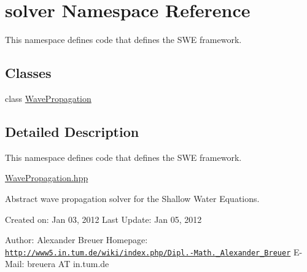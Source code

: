 \hypertarget{namespacesolver}{}\section{solver Namespace Reference}
\label{namespacesolver}


This namespace defines code that defines the S\+WE framework.  


\subsection*{Classes}
\begin{DoxyCompactItemize}
\item 
class \hyperlink{classsolver_1_1WavePropagation}{Wave\+Propagation}
\end{DoxyCompactItemize}


\subsection{Detailed Description}
This namespace defines code that defines the S\+WE framework. 

\hyperlink{WavePropagation_8hpp}{Wave\+Propagation.\+hpp}

Abstract wave propagation solver for the Shallow Water Equations.

Created on\+: Jan 03, 2012 Last Update\+: Jan 05, 2012

Author\+: Alexander Breuer Homepage\+: \href{http://www5.in.tum.de/wiki/index.php/Dipl.-Math._Alexander_Breuer}{\tt http\+://www5.\+in.\+tum.\+de/wiki/index.\+php/\+Dipl.-\/\+Math.\+\_\+\+Alexander\+\_\+\+Breuer} E-\/\+Mail\+: breuera AT in.\+tum.\+de 